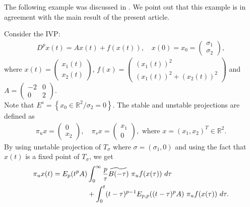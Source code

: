 The following example was discussed in \cite{cong2016stable}. We point out that this example is in agreement with the main result of the present article.
\begin{exmp}
	 Consider the IVP:
	 \begin{align}
	 D^p x(t) = A x(t) + f(x(t)),\quad  x(0) = x_0 = \begin{pmatrix}
	 \sigma_1 \\ \sigma_2
	 \end{pmatrix},
	 \end{align}
	 where $x(t) = \begin{pmatrix}
	 x_1(t) \\ x_2(t)  \end{pmatrix}$, $f(x) = \begin{pmatrix}
	 (x_{1}(t))^2 \\ (x_1(t))^2 + (x_2(t))^2 
	 \end{pmatrix}$ and $
	 A = \begin{pmatrix}
	 -2 & 0 \\
	 0 & 2
	 \end{pmatrix}.$\\ 
	 Note that $E^s = \left\lbrace x_0 \in \mathbb{R}^2 / \sigma_2 = 0\right\rbrace $.
	 The stable and unstable projections are defined as    
	 \begin{align}
	 \pi_u x = \begin{pmatrix}
	 0 \\ x_2 
	 \end{pmatrix}, \quad \pi_s x = \begin{pmatrix}
	 x_1 \\ 0 
	 \end{pmatrix}, \text{ where  }x = (x_1,x_2)^T \in \mathbb{R}^2.\end{align}
	 By using unstable projection of $T_{\sigma}$ where $\sigma = (\sigma_1,0)$ and using the fact that $x(t)$ is a fixed point of $T_{\sigma}$, we get
	 \begin{align} \label{ex23}
	 \begin{split}
	 \pi_u x(t) = E_{p}(t^{p} A) &\int_{0}^{\infty} \frac{p}{\tau} \widetilde{B(-\tau)}~ \pi_u f(x(\tau))~ d\tau \\&+ \int_{0}^{t} (t-\tau)^{p-1} E_{p,p}((t-\tau)^p A)~ \pi_u f(x(\tau))~ d\tau.
	 \end{split}
	 \end{align}
	 

\end{exmp}
